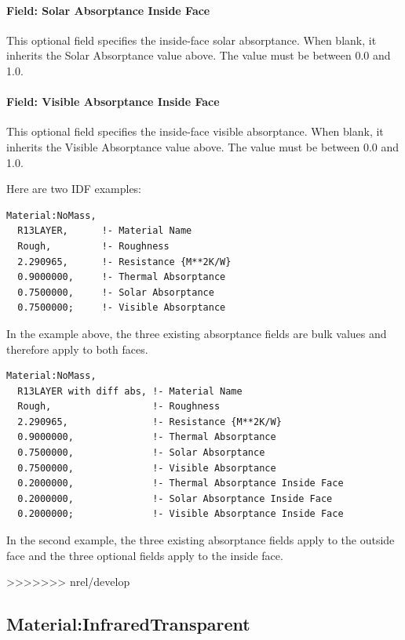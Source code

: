 \paragraph{Field: Solar Absorptance Inside Face}\label{field-solar-absorptance-inside-face-1}

This optional field specifies the inside-face solar absorptance. When blank, it inherits the Solar Absorptance value above. The value must be between 0.0 and 1.0.

\paragraph{Field: Visible Absorptance Inside Face}\label{field-visible-absorptance-inside-face-1}

This optional field specifies the inside-face visible absorptance. When blank, it inherits the Visible Absorptance value above. The value must be between 0.0 and 1.0.

Here are two IDF examples:

\begin{lstlisting}
Material:NoMass,
  R13LAYER,      !- Material Name
  Rough,         !- Roughness
  2.290965,      !- Resistance {M**2K/W}
  0.9000000,     !- Thermal Absorptance
  0.7500000,     !- Solar Absorptance
  0.7500000;     !- Visible Absorptance
\end{lstlisting}

In the example above, the three existing absorptance fields are bulk values and therefore apply to both faces.

\begin{lstlisting}
Material:NoMass,
  R13LAYER with diff abs, !- Material Name
  Rough,                  !- Roughness
  2.290965,               !- Resistance {M**2K/W}
  0.9000000,              !- Thermal Absorptance
  0.7500000,              !- Solar Absorptance
  0.7500000,              !- Visible Absorptance
  0.2000000,              !- Thermal Absorptance Inside Face
  0.2000000,              !- Solar Absorptance Inside Face
  0.2000000;              !- Visible Absorptance Inside Face
\end{lstlisting}

In the second example, the three existing absorptance fields apply to the outside face and the three optional fields apply to the inside face.

>>>>>>> nrel/develop
\subsection{Material:InfraredTransparent}\label{materialinfraredtransparent}

